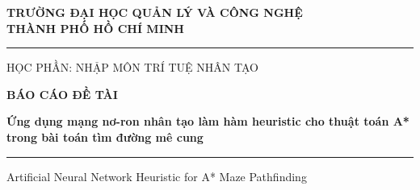 \documentclass[12pt,a4paper]{article}
\begin{document}
\begin{titlepage}
    \thispagestyle{empty}
    \centering

    \vspace*{0.45cm}
    \begin{minipage}{0.92\textwidth}
        \centering
        {\sffamily\bfseries\fontsize{13.8}{18}\selectfont
        TRƯỜNG ĐẠI HỌC QUẢN LÝ VÀ CÔNG NGHỆ\\
        THÀNH PHỐ HỒ CHÍ MINH\par}
        \vspace{0.35cm}
        {\color{Primary}\rule{0.74\textwidth}{0.9pt}\par}
        \vspace{0.25cm}
        {\sffamily\fontsize{12.2}{15}\selectfont HỌC PHẦN: NHẬP MÔN TRÍ TUỆ NHÂN TẠO\par}
    \end{minipage}

    \vspace{2.1cm}

    \begin{tcolorbox}[
        enhanced,
        colback=white,
        colframe=Primary,
        width=0.88\textwidth,
        arc=1mm,
        boxrule=0.9pt,
        left=18pt,
        right=18pt,
        top=22pt,
        bottom=22pt,
        borderline north={2.3pt}{0pt}{Primary},
        borderline south={0.5pt}{0pt}{Primary!45}
    ]
        \centering
        {\sffamily\bfseries\color{Primary}\fontsize{15}{18}\selectfont BÁO CÁO ĐỀ TÀI\par}
        \vspace{0.45cm}
        {\sffamily\bfseries\fontsize{20}{26}\selectfont
        Ứng dụng mạng nơ-ron nhân tạo làm hàm heuristic cho thuật toán A* trong bài toán tìm đường mê cung\par}
        \vspace{0.5cm}
        {\color{Primary!55}\rule{0.58\textwidth}{0.5pt}\par}
        \vspace{0.35cm}
        {\sffamily\fontsize{11.5}{14}\selectfont Artificial Neural Network Heuristic for A* Maze Pathfinding\par}
    \end{tcolorbox}

    \vspace{1.35cm}


\end{titlepage}
\end{document}
